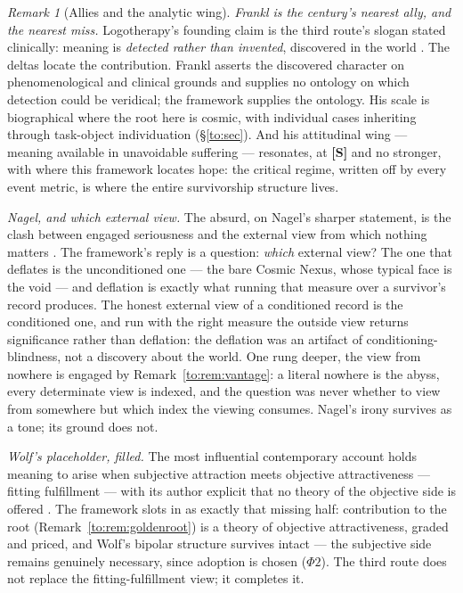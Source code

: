 \documentclass[11pt]{article}
\numberwithin{equation}{section}
\theoremstyle{plain}
\theoremstyle{definition}
\theoremstyle{remark}
\newtheorem{remark}[theorem]{Remark}
\begin{document}
\begin{remark}[Allies and the analytic wing]\label{gs:rem:meaningallies}
\emph{Frankl is the century's nearest ally, and the nearest miss.}
Logotherapy's founding claim is the third route's slogan stated
clinically: meaning is \emph{detected rather than invented},
discovered in the world \cite{Frankl59}. The deltas locate the
contribution. Frankl asserts the discovered character on
phenomenological and clinical grounds and supplies no ontology on
which detection could be veridical; the framework supplies the
ontology. His scale is biographical where the root here is cosmic,
with individual cases inheriting through task-object individuation
(\S\ref{to:sec}). And his attitudinal wing --- meaning available in
unavoidable suffering --- resonates, at \textbf{[S]} and no
stronger, with where this framework locates hope: the critical
regime, written off by every event metric, is where the entire
survivorship structure lives.

\emph{Nagel, and which external view.} The absurd, on Nagel's
sharper statement, is the clash between engaged seriousness and the
external view from which nothing matters \cite{Nagel71}. The
framework's reply is a question: \emph{which} external view? The one
that deflates is the unconditioned one --- the bare Cosmic Nexus,
whose typical face is the void --- and deflation is exactly what
running that measure over a survivor's record produces. The honest
external view of a conditioned record is the conditioned one, and
run with the right measure the outside view returns significance
rather than deflation: the deflation was an artifact of
conditioning-blindness, not a discovery about the world. One rung
deeper, the view from nowhere is engaged by
Remark~\ref{to:rem:vantage}: a literal nowhere is the abyss, every
determinate view is indexed, and the question was never whether to
view from somewhere but which index the viewing consumes. Nagel's
irony survives as a tone; its ground does not.

\emph{Wolf's placeholder, filled.} The most influential
contemporary account holds meaning to arise when subjective
attraction meets objective attractiveness --- fitting fulfillment
--- with its author explicit that no theory of the objective side is
offered \cite{Wolf10}. The framework slots in as exactly that
missing half: contribution to the root
(Remark~\ref{to:rem:goldenroot}) is a theory of objective
attractiveness, graded and priced, and Wolf's bipolar structure
survives intact --- the subjective side remains genuinely necessary,
since adoption is chosen ($\Phi2$). The third route does not replace
the fitting-fulfillment view; it completes it.


\end{remark}
\end{document}
